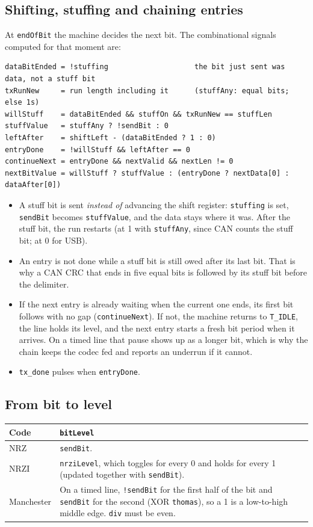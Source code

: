 \documentclass[11pt,a4paper]{article}
\newcommand{\sig}[1]{\texttt{#1}}
\begin{document}
\subsection{Shifting, stuffing and chaining entries}

At \sig{endOfBit} the machine decides the next bit. The combinational signals computed for that moment are:

\begin{lstlisting}
dataBitEnded = !stuffing                    the bit just sent was data, not a stuff bit
txRunNew     = run length including it      (stuffAny: equal bits; else 1s)
willStuff    = dataBitEnded && stuffOn && txRunNew == stuffLen
stuffValue   = stuffAny ? !sendBit : 0
leftAfter    = shiftLeft - (dataBitEnded ? 1 : 0)
entryDone    = !willStuff && leftAfter == 0
continueNext = entryDone && nextValid && nextLen != 0
nextBitValue = willStuff ? stuffValue : (entryDone ? nextData[0] : dataAfter[0])
\end{lstlisting}

\begin{itemize}
\item A stuff bit is sent \emph{instead of} advancing the shift register: \sig{stuffing} is set, \sig{sendBit} becomes \sig{stuffValue}, and the data stays where it was. After the stuff bit, the run restarts (at 1 with \sig{stuffAny}, since CAN counts the stuff bit; at 0 for USB).
\item An entry is not done while a stuff bit is still owed after its last bit. That is why a CAN CRC that ends in five equal bits is followed by its stuff bit before the delimiter.
\item If the next entry is already waiting when the current one ends, its first bit follows with no gap (\sig{continueNext}). If not, the machine returns to \sig{T\_IDLE}, the line holds its level, and the next entry starts a fresh bit period when it arrives. On a timed line that pause shows up as a longer bit, which is why the chain keeps the codec fed and reports an underrun if it cannot.
\item \sig{tx\_done} pulses when \sig{entryDone}.
\end{itemize}

\subsection{From bit to level}

\begin{center}
\begin{tabularx}{\linewidth}{@{}l L@{}}
\toprule
Code & \sig{bitLevel} \\
\midrule
NRZ & \sig{sendBit}. \\
NRZI & \sig{nrziLevel}, which toggles for every 0 and holds for every 1 (updated together with \sig{sendBit}). \\
Manchester & On a timed line, \sig{!sendBit} for the first half of the bit and \sig{sendBit} for the second (XOR \sig{thomas}), so a 1 is a low-to-high middle edge. \sig{div} must be even. \\
\bottomrule
\end{tabularx}
\end{center}
\end{document}
